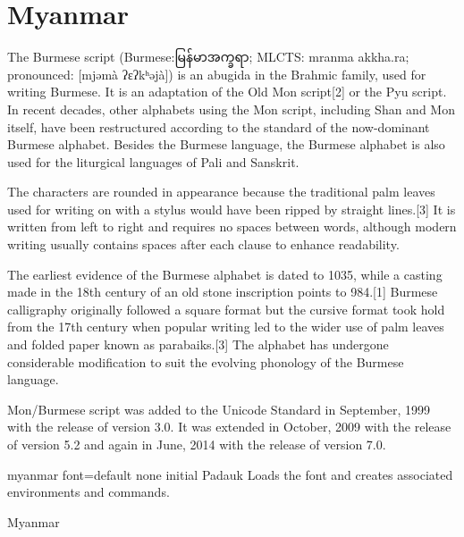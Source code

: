 \section{Myanmar}
\label{s:myanmar}


The Burmese script (Burmese:{\myanmar မြန်မာအက္ခရာ}; MLCTS: mranma akkha.ra; pronounced: [mjəmà ʔɛʔkʰəjà]) is an abugida in the Brahmic family, used for writing Burmese. It is an adaptation of the Old Mon script[2] or the Pyu script. In recent decades, other alphabets using the Mon script, including Shan and Mon itself, have been restructured according to the standard of the now-dominant Burmese alphabet. Besides the Burmese language, the Burmese alphabet is also used for the liturgical languages of Pali and Sanskrit.

The characters are rounded in appearance because the traditional palm leaves used for writing on with a stylus would have been ripped by straight lines.[3] It is written from left to right and requires no spaces between words, although modern writing usually contains spaces after each clause to enhance readability.

The earliest evidence of the Burmese alphabet is dated to 1035, while a casting made in the 18th century of an old stone inscription points to 984.[1] Burmese calligraphy originally followed a square format but the cursive format took hold from the 17th century when popular writing led to the wider use of palm leaves and folded paper known as parabaiks.[3] The alphabet has undergone considerable modification to suit the evolving phonology of the Burmese language.

Mon/Burmese script was added to the Unicode Standard in September, 1999 with the release of version 3.0. It was extended in October, 2009 with the release of version 5.2 and again in June, 2014 with the release of version 7.0.

\begin{docKey}[phd]{myanmar font}{=}{default none initial Padauk}
Loads the font and creates associated environments and commands.
\end{docKey}

\begin{scriptexample}[]{Myanmar}
\end{scriptexample}







